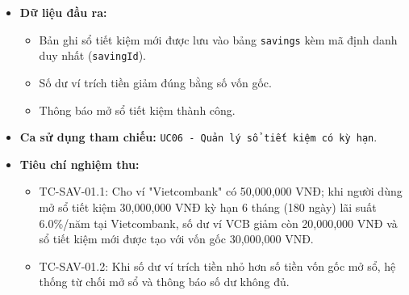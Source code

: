 \documentclass[11pt,a4paper]{article}
\providecommand{\tightlist}{
  \setlength{\itemsep}{0pt}\setlength{\parskip}{0pt}}
\begin{document}
\begin{itemize}
  \begin{itemize}
  \tightlist
  \item
    Kiểm tra số dư khả dụng của ví trích tiền theo \texttt{BR-FIN-02}:
    \(Balance_{wallet} - principal \ge 0\). Nếu không đủ tiền, từ chối
    mở sổ.
  \item
    Trừ số tiền vốn gốc \(principal\) khỏi số dư ví trích tiền.
  \item
    Tra cứu số ngày kỳ hạn (\(TermDays\)) từ bảng chuẩn hóa
    \texttt{database.term} dựa trên mã \texttt{term}:

    \begin{itemize}
    \tightlist
    \item
      \texttt{unlimited}: 0 ngày.
    \item
      \texttt{1M}: 30 ngày; \texttt{3M}: 90 ngày; \texttt{6M}: 180 ngày;
      \texttt{12M}: 365 ngày; \texttt{24M}: 730 ngày; \texttt{36M}: 1095
      ngày; \texttt{60M}: 1825 ngày.
    \end{itemize}
  \item
    Xác định ngày đáo hạn: \(MaturityDate = start + TermDays\) (nếu có
    kỳ hạn).
  \item
    Khởi tạo sổ tiết kiệm với trạng thái \texttt{OPEN}, ghi nhận số dư
    ban đầu \(Balance = principal\).
  \item
    Nếu có gắn mã quỹ mục tiêu \texttt{fund}, ghi nhận liên kết tài sản
    này vào quỹ theo \texttt{BR-FIN-08}.
  \end{itemize}
\item
  \textbf{Dữ liệu đầu ra:}

  \begin{itemize}
  \tightlist
  \item
    Bản ghi sổ tiết kiệm mới được lưu vào bảng \texttt{savings} kèm mã
    định danh duy nhất (\texttt{savingId}).
  \item
    Số dư ví trích tiền giảm đúng bằng số vốn gốc.
  \item
    Thông báo mở sổ tiết kiệm thành công.
  \end{itemize}
\item
  \textbf{Ca sử dụng tham chiếu:}
  \texttt{UC06\ -\ Quản\ lý\ sổ\ tiết\ kiệm\ có\ kỳ\ hạn}.
\item
  \textbf{Tiêu chí nghiệm thu:}

  \begin{itemize}
  \tightlist
  \item
    TC-SAV-01.1: Cho ví "Vietcombank" có 50,000,000 VNĐ; khi người dùng
    mở sổ tiết kiệm 30,000,000 VNĐ kỳ hạn 6 tháng (180 ngày) lãi suất
    6.0\%/năm tại Vietcombank, số dư ví VCB giảm còn 20,000,000 VNĐ và
    sổ tiết kiệm mới được tạo với vốn gốc 30,000,000 VNĐ.
  \item
    TC-SAV-01.2: Khi số dư ví trích tiền nhỏ hơn số tiền vốn gốc mở sổ,
    hệ thống từ chối mở sổ và thông báo số dư không đủ.
  \end{itemize}
\end{itemize}
\end{document}
